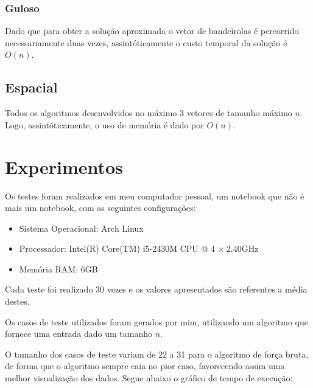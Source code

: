 \documentclass[
	12pt,
	a4paper,
	onepage,
	brazil
]{article}
\begin{document}
	\subsubsection{Guloso}
	
	Dado que para obter a solução aproximada o vetor de bandeirolas é percorrido necessariamente duas vezes, assintóticamente o custo temporal da solução é $O(n)$.
	
	\subsection{Espacial}
	
	Todos os algoritmos desenvolvidos no máximo 3 vetores de tamanho máximo $n$. Logo, assintóticamente, o uso de memória é dado por $O(n)$.
	
	\section{Experimentos}
	
	Os testes foram realizados em meu computador pessoal, um notebook que não é mais um notebook, com as seguintes configurações:
	
	\begin{itemize}
		\item Sistema Operacional: Arch Linux
		\item Processador: Intel(R) Core(TM) i5-2430M CPU @ 4 $\times \ $2.40GHz
		\item Memória RAM: 6GB
	\end{itemize}
	
	Cada teste foi realizado 30 vezes e os valores apresentados são referentes a média destes.
	
	Os casos de teste utilizados foram gerados por mim, utilizando um algoritmo que fornece uma entrada dado um tamanho $n$.
	
	O tamanho dos casos de teste variam de 22 a 31 para o algoritmo de força bruta, de forma que o algoritmo sempre caia no pior caso, favorecendo assim uma melhor visualização dos dados. Segue abaixo o gráfico de tempo de execução:
	
\end{document}
